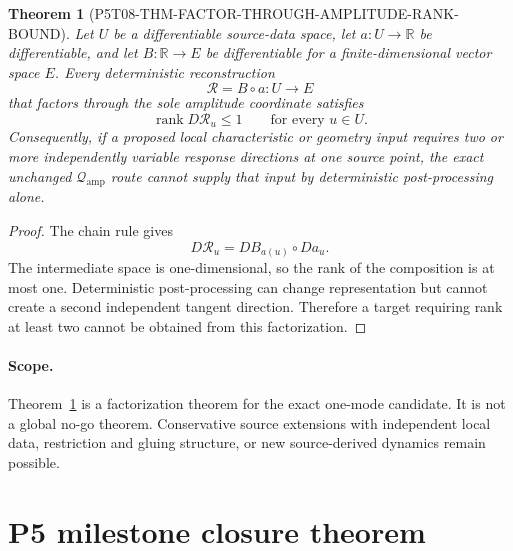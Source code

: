 \documentclass[11pt]{article}
\newtheorem{theorem}{Theorem}
\newcommand{\Qamp}{\mathcal Q_{\mathrm{amp}}}
\begin{document}
\begin{theorem}[P5T08-THM-FACTOR-THROUGH-AMPLITUDE-RANK-BOUND]
\label{thm:rank}
Let \(U\) be a differentiable source-data space, let
\(a:U\to\mathbb R\) be differentiable, and let
\(B:\mathbb R\to E\) be differentiable for a finite-dimensional vector
space \(E\).  Every deterministic reconstruction
\[
  \mathcal R=B\circ a:U\to E
\]
that factors through the sole amplitude coordinate satisfies
\[
  \operatorname{rank}D\mathcal R_u\leq1
  \qquad\text{for every }u\in U.
\]
Consequently, if a proposed local characteristic or geometry input requires
two or more independently variable response directions at one source point,
the exact unchanged \(\Qamp\) route cannot supply that input by deterministic
post-processing alone.
\end{theorem}

\begin{proof}
The chain rule gives
\[
 D\mathcal R_u=DB_{a(u)}\circ Da_u.
\]
The intermediate space is one-dimensional, so the rank of the composition is
at most one.  Deterministic post-processing can change representation but
cannot create a second independent tangent direction.  Therefore a target
requiring rank at least two cannot be obtained from this factorization.
\end{proof}

\paragraph{Scope.}
Theorem~\ref{thm:rank} is a factorization theorem for the exact one-mode
candidate.  It is not a global no-go theorem.  Conservative source extensions
with independent local data, restriction and gluing structure, or new
source-derived dynamics remain possible.

\section{P5 milestone closure theorem}
\end{document}
